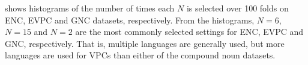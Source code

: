 \documentclass[output=paper,modfonts,nonflat]{langsci/langscibook}
\begin{document}
 shows histograms of the number of times each
$N$ is selected over 100 folds on ENC, EVPC and GNC datasets,
respectively. From the histograms, $N=6$, $N=15$ and $N=2$ are the
most commonly selected settings for ENC, EVPC and GNC,
respectively. That is, multiple languages are generally used, but more
languages are used for  VPCs than either of the compound noun
datasets.

\begin{table}[t]
\caption{Pearson's correlation on the ENC, EVPC and GNC datasets}
\label{tab:results}
\end{table}
\end{document}
